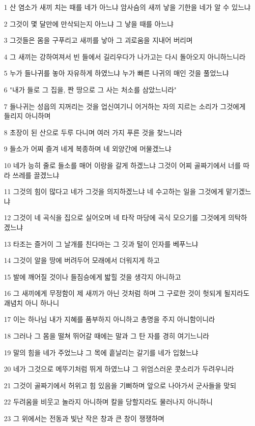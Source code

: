 \par 1 산 염소가 새끼 치는 때를 네가 아느냐 암사슴의 새끼 낳을 기한을 네가 알 수 있느냐
\par 2 그것이 몇 달만에 만삭되는지 아느냐 그 낳을 때를 아느냐
\par 3 그것들은 몸을 구푸리고 새끼를 낳아 그 괴로움을 지내어 버리며
\par 4 그 새끼는 강하여져서 빈 들에서 길리우다가 나가고는 다시 돌아오지 아니하느니라
\par 5 누가 들나귀를 놓아 자유하게 하였느냐 누가 빠른 나귀의 매인 것을 풀었느냐
\par 6 "내가 들로 그 집을, 짠 땅으로 그 사는 처소를 삼았느니라"
\par 7 들나귀는 성읍의 지꺼리는 것을 업신여기니 어거하는 자의 지르는 소리가 그것에게 들리지 아니하며
\par 8 초장이 된 산으로 두루 다니며 여러 가지 푸른 것을 찾느니라
\par 9 들소가 어찌 즐겨 네게 복종하며 네 외양간에 머물겠느냐
\par 10 네가 능히 줄로 들소를 매어 이랑을 갈게 하겠느냐 그것이 어찌 골짜기에서 너를 따라 쓰레를 끌겠느냐
\par 11 그것의 힘이 많다고 네가 그것을 의지하겠느냐 네 수고하는 일을 그것에게 맡기겠느냐
\par 12 그것이 네 곡식을 집으로 실어오며 네 타작 마당에 곡식 모으기를 그것에게 의탁하겠느냐
\par 13 타조는 즐거이 그 날개를 친다마는 그 깃과 털이 인자를 베푸느냐
\par 14 그것이 알을 땅에 버려두어 모래에서 더워지게 하고
\par 15 발에 깨어질 것이나 들짐승에게 밟힐 것을 생각지 아니하고
\par 16 그 새끼에게 무정함이 제 새끼가 아닌 것처럼 하며 그 구로한 것이 헛되게 될지라도 괘념치 아니 하나니
\par 17 이는 하나님 내가 지혜를 품부하지 아니하고 총명을 주지 아니함이니라
\par 18 그러나 그 몸을 떨쳐 뛰어갈 때에는 말과 그 탄 자를 경히 여기느니라
\par 19 말의 힘을 네가 주었느냐 그 목에 흩날리는 갈기를 네가 입혔느냐
\par 20 네가 그것으로 메뚜기처럼 뛰게 하였느냐 그 위엄스러운 콧소리가 두려우니라
\par 21 그것이 골짜기에서 허위고 힘 있음을 기뻐하며 앞으로 나아가서 군사들을 맞되
\par 22 두려움을 비웃고 놀라지 아니하며 칼을 당할지라도 물러나지 아니하니
\par 23 그 위에서는 전동과 빛난 작은 창과 큰 창이 쟁쟁하며
